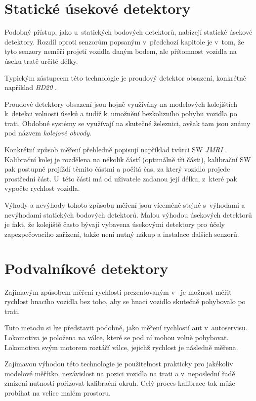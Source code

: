 \section{Statické úsekové detektory}

Podobný přístup, jako u~statických bodových detektorů, nabízejí statické
úsekové detektory. Rozdíl oproti senzorům popsaným v~předchozí kapitole je
v~tom, že tyto senzory neměří projetí vozidla daným bodem, ale přítomnost vozidla
na úseku tratě určité délky.

Typickým zástupcem této technologie je proudový detektor obsazení, konkrétně
například \textit{BD20} \cite{bd20}.

Proudové detektory obsazení jsou hojně využívány na modelových kolejištích k~detekci
volnosti úseků a tudíž k~umožnění bezkolizního pohybu vozidla po trati.
Obdobné systémy se využívají na skutečné železnici, avšak tam jsou známy pod
názvem \textit{kolejové obvody}.

Konkrétní způsob měření přehledně popisují například tvůrci SW \textit{JMRI}
\cite{jmri:speedometer}.
Kalibrační kolej je rozdělena na několik částí (optimálně tři části), kalibrační
SW pak postupně projíždí těmito částmi a počítá čas, za který vozidlo projede
prostřední část. U~této části má od uživatele zadanou její délku, z~které pak
vypočte rychlost vozidla.

Výhody a nevýhody tohoto způsobu měření jsou víceméně stejné s~výhodami a
nevýhodami statických bodových detektorů. Malou výhodou úsekových detektorů je
fakt, že kolejiště často bývají vybavena úsekovými detektory pro účely
zapezpečovacího zařízení, takže není nutný nákup a instalace dalších senzorů.

\section{Podvalníkové detektory}

Zajímavým způsobem měření rychlosti prezentovaným v~\cite{bachrus}
je možnost měřit rychlost hnacího vozidla bez toho, aby se hnací vozidlo
skutečně pohybovalo po trati.

Tuto metodu si lze představit podobně, jako měření rychlostí aut v~autoservisu.
Lokomotiva je položena na válce, které se pod ní mohou volně pohybovat.
Lokomotiva svým motorem roztáčí válce, jejichž rychlost je následně měřena.

Zajímavou výhodou této technologie je použitelnost prakticky pro jakékoliv
modelové měřítko, nezávislost na pozici vozidla na trati a v~neposlední řadě
zmizení nutnosti pořizovat kalibrační okruh. Celý proces kalibrace tak může
probíhat na velice malém prostoru.

